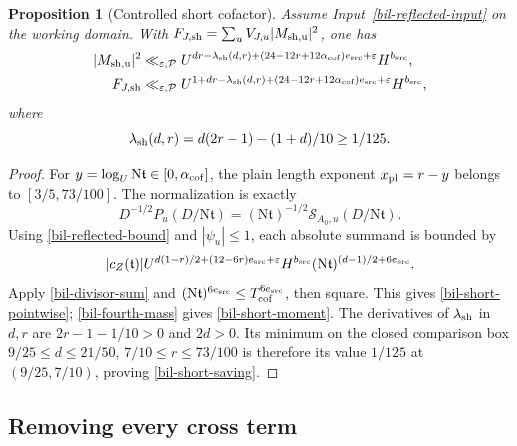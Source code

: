 \documentclass[11pt]{article}
\newtheorem{proposition}[theorem]{Proposition}
\theoremstyle{definition}
\newcommand{\N}{\mathrm N}
\newcommand{\eps}{\varepsilon}
\begin{document}
\begin{proposition}[Controlled short cofactor]
\label{bil-short-bound}
Assume Input~\ref{bil-reflected-input} on the working domain.
With $F_{J,\rm sh}=\sum_uV_{J,u}|M_{\rm sh,u}|^2$, one has
\begin{align}
 |M_{\rm sh,u}|^2&\ll_{\eps,\mathcal P}
 U^{dr-\lambda_{\rm sh}(d,r)
       +(24-12r+12\alpha_{\rm cof})e_{\rm src}+\eps}H^{b_{\rm src}},
                                      \label{bil-short-pointwise}\\
 F_{J,\rm sh}&\ll_{\eps,\mathcal P}
 U^{1+dr-\lambda_{\rm sh}(d,r)
       +(24-12r+12\alpha_{\rm cof})e_{\rm src}+\eps}H^{b_{\rm src}},
                                      \label{bil-short-moment}
\end{align}
where
\begin{equation}\label{bil-short-saving}
 \lambda_{\rm sh}(d,r)
       =d(2r-1)-(1+d)/10\ge1/125.
\end{equation}
\end{proposition}
\begin{proof}
For $y=\log_U\N\mathfrak t\in[0,\alpha_{\rm cof}]$, the plain length exponent
$x_{\rm pl}=r-y$ belongs to $[3/5,73/100]$.  The normalization is exactly
\[
 D^{-1/2}P_u(D/\N\mathfrak t)
     =(\N\mathfrak t)^{-1/2}
                         \mathcal S_{A_0,u}(D/\N\mathfrak t).
\]
Using \eqref{bil-reflected-bound} and $|\psi_u|\le1$, each absolute
summand is bounded by
\[
 |c_Z(\mathfrak t)|
 U^{d(1-r)/2+(12-6r)e_{\rm src}+\eps}H^{b_{\rm src}}
 (\N\mathfrak t)^{(d-1)/2+6e_{\rm src}}.
\]
Apply \eqref{bil-divisor-sum} and
$(\N\mathfrak t)^{6e_{\rm src}}\le T_{\rm cof}^{6e_{\rm src}}$,
then square.  This gives \eqref{bil-short-pointwise};
\eqref{bil-fourth-mass} gives \eqref{bil-short-moment}.
The derivatives of $\lambda_{\rm sh}$ in $d,r$ are
$2r-1-1/10>0$ and $2d>0$.  Its minimum on the closed comparison box
$9/25\le d\le21/50$, $7/10\le r\le73/100$ is therefore
its value $1/125$ at $(9/25,7/10)$, proving \eqref{bil-short-saving}.
\end{proof}

\subsection{Removing every cross term}
\end{document}

